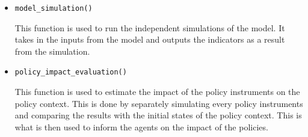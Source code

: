 \documentclass[11pt]{article}
\begin{document}
\begin{itemize}
\item \texttt{model\_simulation()}

This function is used to run the independent simulations of the model. It takes in the inputs from the model and outputs the indicators as a result from the simulation.

\item \texttt{policy\_impact\_evaluation()}

This function is used to estimate the impact of the policy instruments on the policy context. This is done by separately simulating every policy instruments and comparing the results with the initial states of the policy context. This is what is then used to inform the agents on the impact of the policies.

\end{itemize}



\appendix


 

\end{document}
